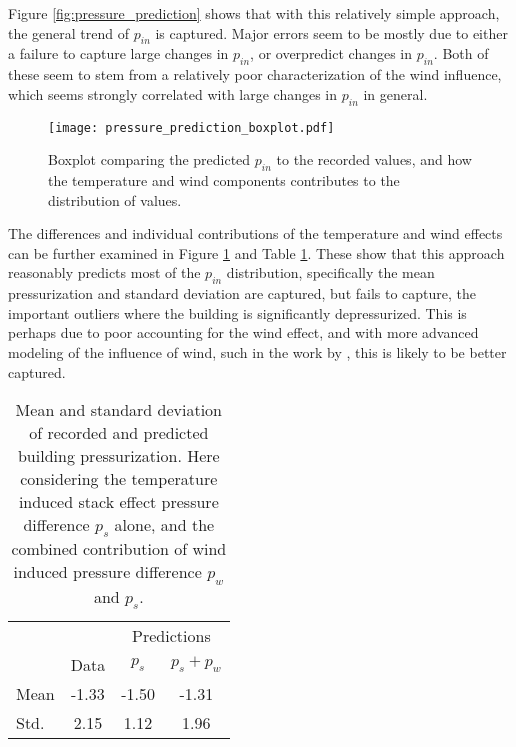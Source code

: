 Figure \ref{fig:pressure_prediction} shows that with this relatively simple approach, the general trend of $p_{in}$ is captured.
Major errors seem to be mostly due to either a failure to capture large changes in $p_{in}$, or overpredict changes in $p_{in}$.
Both of these seem to stem from a relatively poor characterization of the wind influence, which seems strongly correlated with large changes in $p_{in}$ in general.\par

\begin{figure}[htb!]
  \centering
  \texttt{[image: pressure\_prediction\_boxplot.pdf]}
  \caption{Boxplot comparing the predicted $p_{in}$ to the recorded values, and how the temperature and wind components contributes to the distribution of values.}
  \label{fig:pressure_prediction_boxplot}
\end{figure}

The differences and individual contributions of the temperature and wind effects can be further examined in Figure \ref{fig:pressure_prediction_boxplot} and Table \ref{tbl:pressure_prediction}. These show that this approach reasonably predicts most of the $p_{in}$ distribution, specifically the mean pressurization and standard deviation are captured, but fails to capture, the important outliers where the building is significantly depressurized.
This is perhaps due to poor accounting for the wind effect, and with more advanced modeling of the influence of wind, such in the work by \citeauthor{shirazi_three-dimensional_2017}\cite{shirazi_three-dimensional_2017}, this is likely to be better captured.\par

\begin{table}[htb!]
  \centering
  \begin{tabular}{l c c c}
    \toprule
    & & \multicolumn{2}{c}{Predictions} \\ \cmidrule(r){3-4}
    & Data & $p_s$ & $p_s + p_w$ \\
    \midrule
    Mean & -1.33 & -1.50 & -1.31 \\
    Std. & 2.15 & 1.12 & 1.96 \\
    \bottomrule
  \end{tabular}
  \caption[Mean and standard deviation of recorded and weather predicted building pressurization.]{Mean and standard deviation of recorded and predicted building pressurization. Here considering the temperature induced stack effect pressure difference $p_s$ alone, and the combined contribution of wind induced pressure difference $p_w$ and $p_s$.}
  \label{tbl:pressure_prediction}
\end{table}


